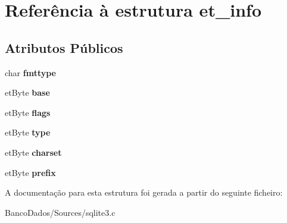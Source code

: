 \hypertarget{structet__info}{\section{Referência à estrutura et\-\_\-info}
\label{structet__info}
}
\subsection*{Atributos Públicos}
\begin{DoxyCompactItemize}
\item 
\hypertarget{structet__info_a1740af27f0c9d5840e7dda59a129aa4b}{char {\bfseries fmttype}}\label{structet__info_a1740af27f0c9d5840e7dda59a129aa4b}

\item 
\hypertarget{structet__info_a20f5a4c11c7aa1d9c777805d11965c66}{et\-Byte {\bfseries base}}\label{structet__info_a20f5a4c11c7aa1d9c777805d11965c66}

\item 
\hypertarget{structet__info_a8f11646aaec803f0870683dc3ba2f756}{et\-Byte {\bfseries flags}}\label{structet__info_a8f11646aaec803f0870683dc3ba2f756}

\item 
\hypertarget{structet__info_a148bd1efa49018c9a723701ba5747825}{et\-Byte {\bfseries type}}\label{structet__info_a148bd1efa49018c9a723701ba5747825}

\item 
\hypertarget{structet__info_a77131acb7479b0e6aad61af0901e11c2}{et\-Byte {\bfseries charset}}\label{structet__info_a77131acb7479b0e6aad61af0901e11c2}

\item 
\hypertarget{structet__info_a23cc866bf202c34e49bd49599b051628}{et\-Byte {\bfseries prefix}}\label{structet__info_a23cc866bf202c34e49bd49599b051628}

\end{DoxyCompactItemize}


A documentação para esta estrutura foi gerada a partir do seguinte ficheiro\-:\begin{DoxyCompactItemize}
\item 
Banco\-Dados/\-Sources/sqlite3.\-c\end{DoxyCompactItemize}
